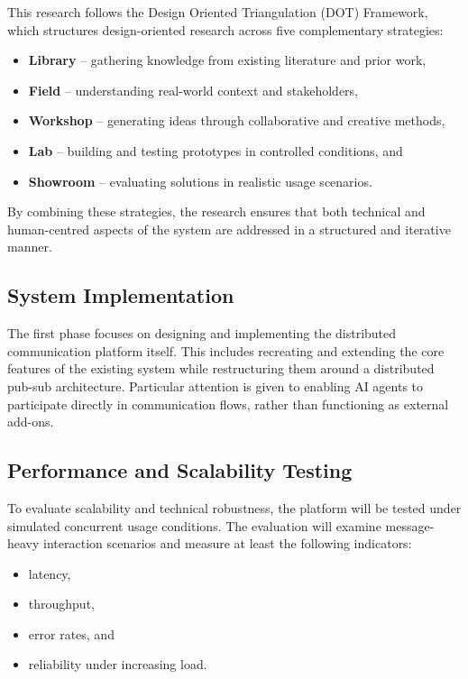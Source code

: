 \documentclass[11pt]{article}
\begin{document}
This research follows the Design Oriented Triangulation (DOT) Framework, which structures design-oriented research across five complementary strategies:

\begin{itemize}
    \item \textbf{Library} – gathering knowledge from existing literature and prior work,
    \item \textbf{Field} – understanding real-world context and stakeholders,
    \item \textbf{Workshop} – generating ideas through collaborative and creative methods,
    \item \textbf{Lab} – building and testing prototypes in controlled conditions, and
    \item \textbf{Showroom} – evaluating solutions in realistic usage scenarios.
\end{itemize}

By combining these strategies, the research ensures that both technical and human-centred aspects of the system are addressed in a structured and iterative manner.

\subsection{System Implementation}

The first phase focuses on designing and implementing the distributed communication platform itself. This includes recreating and extending the core features of the existing system while restructuring them around a distributed pub-sub architecture. Particular attention is given to enabling AI agents to participate directly in communication flows, rather than functioning as external add-ons.

\subsection{Performance and Scalability Testing}

To evaluate scalability and technical robustness, the platform will be tested under simulated concurrent usage conditions. The evaluation will examine message-heavy interaction scenarios and measure at least the following indicators:

\begin{itemize}
    \item latency,
    \item throughput,
    \item error rates, and
    \item reliability under increasing load.
\end{itemize}
\end{document}
